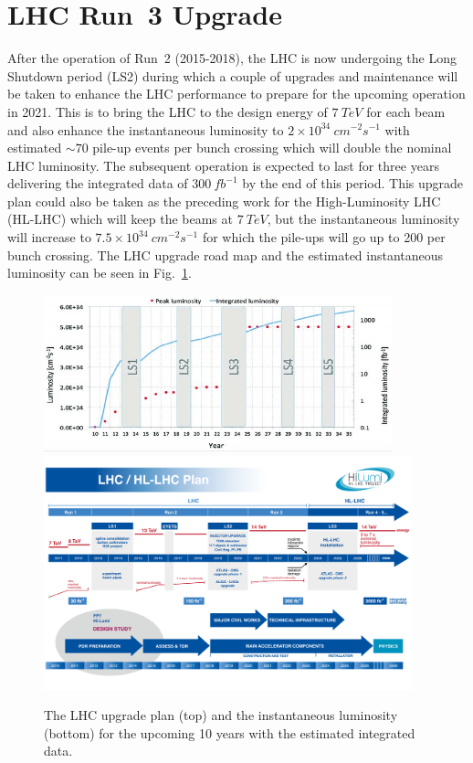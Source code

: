 \section{LHC Run~3 Upgrade}
After the operation of Run~2 (2015-2018), the LHC is now undergoing the Long Shutdown period (LS2) during which a couple of upgrades and maintenance will be taken to enhance the LHC performance to prepare for the upcoming operation in 2021. This is to bring the LHC to the design energy of $7~TeV$ for each beam and also enhance the instantaneous luminosity to $2\times10^{34}~cm^{-2}s^{-1}$ with estimated $\sim 70$ pile-up events per bunch crossing which will double the nominal LHC luminosity. The subsequent operation is expected to last for three years delivering the integrated data of $300~fb^{-1}$ by the end of this period. This upgrade plan could also be taken as the preceding work for the High-Luminosity LHC (HL-LHC) which will keep the beams at $7~TeV$, but the instantaneous luminosity will increase to $7.5\times10^{34}~cm^{-2}s^{-1}$ for which the pile-ups will go up to 200 per bunch crossing. The LHC upgrade road map and the estimated instantaneous luminosity can be seen in Fig.~\ref{Fig:LHC_upgrade}.
\begin{figure}[!h]                
	\includegraphics[width=0.9\textwidth]{Chapter6/The-LHC-upgrade-schedule-and-associated-luminosity.jpg}
	\includegraphics[width=0.95\textwidth]{Chapter6/Schedule_HL.png}
	\begin{center}
		\caption{The LHC upgrade plan (top)\cite{schedule} and the instantaneous luminosity (bottom)\cite{Atlas:2019qfx} for the upcoming 10 years with the estimated integrated data.}
		\label{Fig:LHC_upgrade}            
	\end{center}
\end{figure} 
